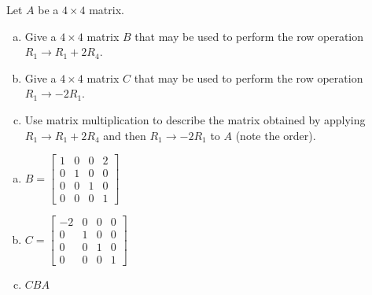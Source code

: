 
\begin{exerciseStatement}


Let \(A\) be a \(4 \times 4\) matrix.


\begin{enumerate}[(a)]
\item Give a \(4 \times 4\) matrix \(B\) that may be used to perform the row operation \( R_1 \to R_1 + 2R_4 \).
\item Give a \(4 \times 4\) matrix \(C\) that may be used to perform the row operation \( R_1 \to -2R_1 \).
\item Use matrix multiplication to describe the matrix obtained by applying \( R_1 \to R_1 + 2R_4 \) and then \( R_1 \to -2R_1 \) to \(A\) (note the order). 
\end{enumerate}
    
\end{exerciseStatement}
    
\begin{exerciseAnswer} 

\begin{enumerate}[(a)]
\item \(B= \left[\begin{array}{cccc}
1 & 0 & 0 & 2 \\
0 & 1 & 0 & 0 \\
0 & 0 & 1 & 0 \\
0 & 0 & 0 & 1
\end{array}\right] \)
\item \(C= \left[\begin{array}{cccc}
-2 & 0 & 0 & 0 \\
0 & 1 & 0 & 0 \\
0 & 0 & 1 & 0 \\
0 & 0 & 0 & 1
\end{array}\right] \)
\item \(CBA\)
\end{enumerate}
    
\end{exerciseAnswer}
    

